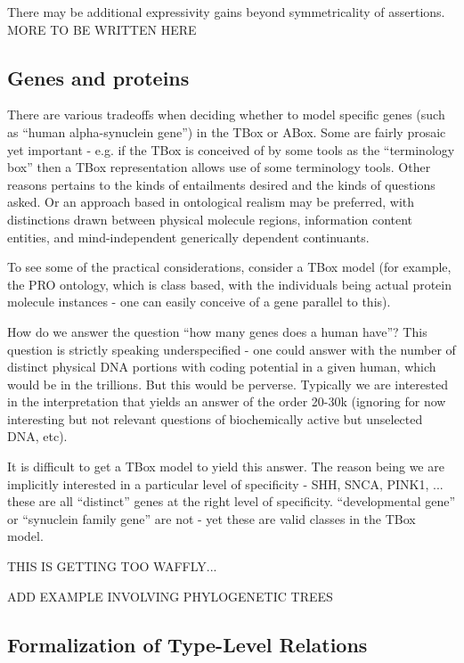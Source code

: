 \documentclass{my}
\begin{document}
There may be additional expressivity gains beyond symmetricality of
assertions. MORE TO BE WRITTEN HERE

\subsection{Genes and proteins}

There are various tradeoffs when deciding whether to model specific
genes (such as ``human alpha-synuclein gene'') in the TBox or
ABox. Some are fairly prosaic yet important - e.g. if the TBox is
conceived of by some tools as the ``terminology box'' then a TBox
representation allows use of some terminology tools. Other reasons
pertains to the kinds of entailments desired and the kinds of
questions asked. Or an approach based in ontological realism may be
preferred, with distinctions drawn between physical molecule regions,
information content entities, and mind-independent generically
dependent continuants.

To see some of the practical considerations, consider a TBox model
(for example, the PRO ontology, which is class based, with the
individuals being actual protein molecule instances - one can easily
conceive of a gene parallel to this).

How do we answer the question ``how many genes does a human have''?
This question is strictly speaking underspecified - one could answer
with the number of distinct physical DNA portions with coding
potential in a given human, which would be in the trillions. But this
would be perverse. Typically we are interested in the interpretation
that yields an answer of the order 20-30k (ignoring for now
interesting but not relevant questions of biochemically active but
unselected DNA, etc).

It is difficult to get a TBox model to yield this answer. The reason
being we are implicitly interested in a particular level of
specificity - SHH, SNCA, PINK1, ... these are all ``distinct'' genes
at the right level of specificity. ``developmental gene'' or
``synuclein family gene'' are not - yet these are valid classes in the
TBox model.

THIS IS GETTING TOO WAFFLY...

ADD EXAMPLE INVOLVING PHYLOGENETIC TREES

\subsection{Formalization of Type-Level Relations}
\end{document}
